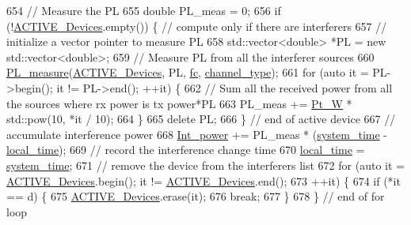 \begin{DoxyCode}
{{{654             \textcolor{comment}{// Measure the PL}
655             \textcolor{keywordtype}{double} PL\_meas = 0;
656             \textcolor{keywordflow}{if} (!\hyperlink{classSTA_a536179d10f961ae6f7330b980a13668e}{ACTIVE\_Devices}.empty()) \{ \textcolor{comment}{// compute only if there are interferers}
657                 \textcolor{comment}{// initialize a vector pointer to measure PL}
658                 std::vector<double> *PL = \textcolor{keyword}{new} std::vector<double>;
659                 \textcolor{comment}{// Measure PL from all the interferer sources}
660                 \hyperlink{PL__measure_8cpp_afb433c5f099becf495d3c9d29ffc707d}{PL\_measure}(\hyperlink{classSTA_a536179d10f961ae6f7330b980a13668e}{ACTIVE\_Devices}, PL, \hyperlink{classSTA_a07c54eac4b0f34790e0a2e4dcbe720ac}{fc}, 
      \hyperlink{classSTA_a5d1a873bdd6733103441abadf4db1475}{channel\_type});
661                 \textcolor{keywordflow}{for} (\textcolor{keyword}{auto} it = PL->begin(); it != PL->end(); ++it) \{
662                     \textcolor{comment}{// Sum all the received power from all the sources where rx power is tx power*PL}
663                     PL\_meas += \hyperlink{classSTA_a8ec6260021c741ccc08a6ec25793c1f3}{Pt\_W} * std::pow(10, *it / 10);
664                 \}
665                 \textcolor{keyword}{delete} PL;
666             \} \textcolor{comment}{// end of active device}
667               \textcolor{comment}{// accumulate interference power}
668             \hyperlink{classSTA_aa1e60f7391861b468314437fbad67280}{Int\_power} += PL\_meas * (\hyperlink{STA_8cpp_aaa03a568dc1d9d3391286ea24b9cfb63}{system\_time} - \hyperlink{classSTA_ad4800b03ee83fe283cc33089eb438359}{local\_time});
669             \textcolor{comment}{// record the interference change time}
670             \hyperlink{classSTA_ad4800b03ee83fe283cc33089eb438359}{local\_time} = \hyperlink{STA_8cpp_aaa03a568dc1d9d3391286ea24b9cfb63}{system\_time};
671             \textcolor{comment}{// remove the device from the interferers list}
672             \textcolor{keywordflow}{for} (\textcolor{keyword}{auto} it = \hyperlink{classSTA_a536179d10f961ae6f7330b980a13668e}{ACTIVE\_Devices}.begin(); it != 
      \hyperlink{classSTA_a536179d10f961ae6f7330b980a13668e}{ACTIVE\_Devices}.end();
673                     ++it) \{
674                 \textcolor{keywordflow}{if} (*it == d) \{
675                     \hyperlink{classSTA_a536179d10f961ae6f7330b980a13668e}{ACTIVE\_Devices}.erase(it);
676                     \textcolor{keywordflow}{break};
677                 \}
678             \} \textcolor{comment}{// end of for loop}
}}}
\end{DoxyCode}
